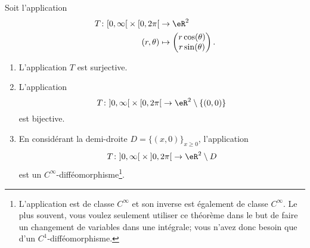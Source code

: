 \begin{theorem}     \label{THOooBETSooXSQhdX}
    Soit l'application
    \begin{equation}
        \begin{aligned}
            T\colon \mathopen[ 0 , \infty \mathclose[\times \mathopen[ 0 , 2\pi \mathclose[&\to \eR^2 \\
                (r,\theta)&\mapsto \begin{pmatrix}
                    r\cos(\theta)    \\ 
                    r\sin(\theta)    
                \end{pmatrix}.
        \end{aligned}
    \end{equation}
    \begin{enumerate}
        \item       \label{ITEMooNGOKooFCXmwy}
            L'application \( T\) est surjective.
        \item       \label{ITEMooMCIOooJiBvug}
            L'application
            \begin{equation}
                T\colon \mathopen] 0 , \infty \mathclose[\times \mathopen[ 0 , 2\pi \mathclose[\to \eR^2\setminus\{ (0,0) \}
            \end{equation}
            est bijective.
        \item       \label{ITEMooZFRGooQPDUtX}
            En considérant la demi-droite \( D=\{ (x,0) \}_{x\geq 0}\), l'application
            \begin{equation}
                T\colon \mathopen] 0 , \infty \mathclose[\times \mathopen] 0 , 2\pi \mathclose[\to \eR^2\setminus D
            \end{equation}
            est un \(  C^{\infty}\)-difféomorphisme\footnote{L'application est de classe \(  C^{\infty}\) et son inverse est également de classe \(  C^{\infty}\). Le plus souvent, vous voulez seulement utiliser ce théorème dans le but de faire un changement de variables dans une intégrale; vous n'avez donc besoin que d'un \( C^1\)-difféomorphisme.}.
    \end{enumerate}
\end{theorem}

